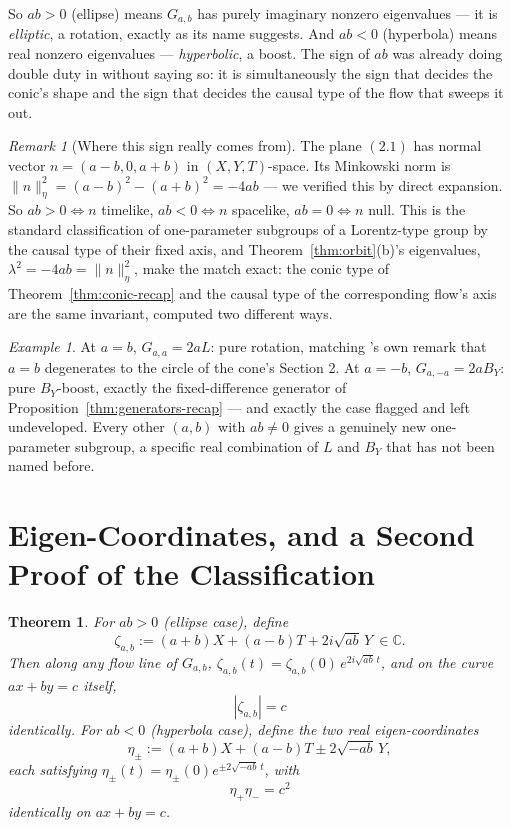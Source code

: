 \documentclass[11pt]{amsart}
\newtheorem{theorem}{Theorem}[section]
\theoremstyle{remark}
\newtheorem*{remark}{Remark}
\newtheorem*{example}{Example}
\begin{document}
So $ab>0$ (ellipse) means $G_{a,b}$ has purely imaginary nonzero eigenvalues --- it is \emph{elliptic}, a rotation, exactly as its name suggests. And $ab<0$ (hyperbola) means real nonzero eigenvalues --- \emph{hyperbolic}, a boost. The sign of $ab$ was already doing double duty in \cite{Ebert2026Table} without saying so: it is simultaneously the sign that decides the conic's shape and the sign that decides the causal type of the flow that sweeps it out.

\begin{remark}[Where this sign really comes from]
The plane $(2.1)$ has normal vector $n=(a-b,0,a+b)$ in $(X,Y,T)$-space. Its Minkowski norm is $\|n\|_\eta^2=(a-b)^2-(a+b)^2=-4ab$ --- we verified this by direct expansion. So $ab>0\iff n$ timelike, $ab<0\iff n$ spacelike, $ab=0\iff n$ null. This is the standard classification of one-parameter subgroups of a Lorentz-type group by the causal type of their fixed axis, and Theorem~\ref{thm:orbit}(b)'s eigenvalues, $\lambda^2=-4ab=\|n\|_\eta^2$, make the match exact: the conic type of Theorem~\ref{thm:conic-recap} and the causal type of the corresponding flow's axis are the same invariant, computed two different ways.
\end{remark}

\begin{example}
At $a=b$, $G_{a,a}=2aL$: pure rotation, matching \cite{Ebert2026Table}'s own remark that $a=b$ degenerates to the circle of the cone's Section 2. At $a=-b$, $G_{a,-a}=2aB_Y$: pure $B_Y$-boost, exactly the fixed-difference generator of Proposition~\ref{thm:generators-recap} --- and exactly the case \cite{Ebert2026Table} flagged and left undeveloped. Every other $(a,b)$ with $ab\ne0$ gives a genuinely new one-parameter subgroup, a specific real combination of $L$ and $B_Y$ that has not been named before.
\end{example}

\section{Eigen-Coordinates, and a Second Proof of the Classification}

\begin{theorem}\label{thm:eigencoord}
For $ab>0$ (ellipse case), define
\begin{equation}
\zeta_{a,b}:=(a+b)X+(a-b)T+2i\sqrt{ab}\,Y\ \in\mathbb C. \tag{4.1}
\end{equation}
Then along any flow line of $G_{a,b}$, $\zeta_{a,b}(t)=\zeta_{a,b}(0)\,e^{2i\sqrt{ab}\,t}$, and on the curve $ax+by=c$ itself,
\begin{equation}
|\zeta_{a,b}|=c \tag{4.2}
\end{equation}
identically. For $ab<0$ (hyperbola case), define the two real eigen-coordinates
\begin{equation}
\eta_\pm:=(a+b)X+(a-b)T\pm2\sqrt{-ab}\,Y, \tag{4.3}
\end{equation}
each satisfying $\eta_\pm(t)=\eta_\pm(0)e^{\pm2\sqrt{-ab}\,t}$, with
\begin{equation}
\eta_+\eta_-=c^2 \tag{4.4}
\end{equation}
identically on $ax+by=c$.
\end{theorem}
\end{document}

